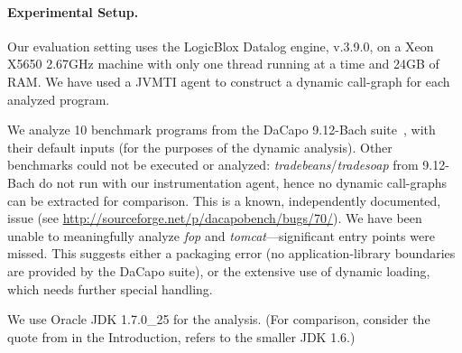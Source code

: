 \paragraph{Experimental Setup.}
Our evaluation setting uses the LogicBlox Datalog engine, v.3.9.0, on
a Xeon X5650 2.67GHz machine with only one thread running at a time
and 24GB of RAM. We have used a JVMTI agent to construct a dynamic
call-graph for each analyzed program.

We analyze 10 benchmark programs from the DaCapo 9.12-Bach
suite~\cite{dacapo:paper}, with their default inputs (for the purposes
of the dynamic analysis). Other benchmarks could not be executed or
analyzed: \emph{tradebeans}/\emph{tradesoap} from 9.12-Bach do not run
with our instrumentation agent, hence no dynamic call-graphs can be
extracted for comparison. This is a known, independently documented,
issue (see {\small \url{http://sourceforge.net/p/dacapobench/bugs/70/}}). We
have been unable to meaningfully analyze \emph{fop} and
\emph{tomcat}---significant entry points were missed. This suggests
either a packaging error 
(no application-library boundaries are provided by the DaCapo suite), or the
extensive use of dynamic loading, which needs further special
handling. 

We use Oracle JDK 1.7.0\_25 for the analysis.  
(For comparison, consider the quote from \cite{www:wala-reflection} in the
Introduction, refers to the smaller JDK 1.6.)



 


